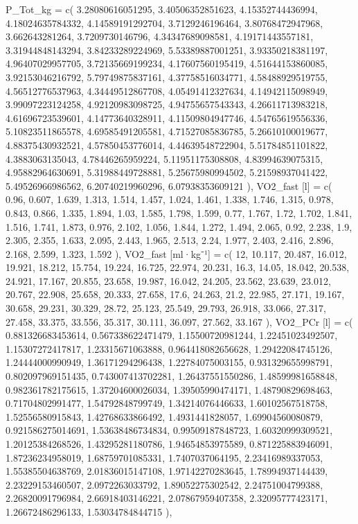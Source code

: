\documentclass[
  letterpaper,
  DIV=11]{scrartcl}
\newenvironment{Shaded}{\begin{snugshade}}{\end{snugshade}}
\newcommand{\NormalTok}[1]{\textcolor[rgb]{0.00,0.23,0.31}{#1}}
\begin{document}
\begin{Shaded}
\begin{Highlighting}[]
\NormalTok{  \textasciigrave{}P\_Tot\_kg\textasciigrave{} = c( 3.28080616051295, 3.40506352851623, 4.15352744436994, 4.18024635784332, 4.14589191292704, 3.7129246196464, 3.80768472947968, 3.662643281264, 3.7209730146796, 4.34347689098581, 4.19171443557181, 3.31944848143294, 3.84233289224969, 5.53389887001251, 3.93350218381197, 4.96407029957705, 3.72135669199234, 4.17607560195419, 4.51644153860085, 3.92153046216792, 5.79749875837161, 4.37758516034771, 4.58488929519755, 4.56512776537963, 4.34449512867708, 4.05491412327634, 4.14942115098949, 3.99097223124258, 4.92120983098725, 4.94755657543343, 4.26611713983218, 4.61696723539601, 4.14773640328911, 4.11509804947746, 4.54765619556336, 5.10823511865578, 4.69585491205581, 4.71527085836785, 5.26610100019677, 4.88375430932521, 4.57850453776014, 4.44639548722904, 5.51784851101822, 4.3883063135043, 4.78446265959224, 5.11951175308808, 4.83994639075315, 4.95882964630691, 5.31988449728881, 5.25675980994502, 5.21598937041422, 5.49526966986562, 6.20740219960296, 6.07938353609121 ),}
\NormalTok{  \textasciigrave{}VO2\_fast [l]\textasciigrave{} = c( 0.96, 0.607, 1.639, 1.313, 1.514, 1.457, 1.024, 1.461, 1.338, 1.746, 1.315, 0.978, 0.843, 0.866, 1.335, 1.894, 1.03, 1.585, 1.798, 1.599, 0.77, 1.767, 1.72, 1.702, 1.841, 1.516, 1.741, 1.873, 0.976, 2.102, 1.056, 1.844, 1.272, 1.494, 2.065, 0.92, 2.238, 1.9, 2.305, 2.355, 1.633, 2.095, 2.443, 1.965, 2.513, 2.24, 1.977, 2.403, 2.416, 2.896, 2.168, 2.599, 1.323, 1.592 ),}
\NormalTok{  \textasciigrave{}VO2\_fast [ml·kg⁻¹]\textasciigrave{} = c( 12, 10.117, 20.487, 16.012, 19.921, 18.212, 15.754, 19.224, 16.725, 22.974, 20.231, 16.3, 14.05, 18.042, 20.538, 24.921, 17.167, 20.855, 23.658, 19.987, 16.042, 24.205, 23.562, 23.639, 23.012, 20.767, 22.908, 25.658, 20.333, 27.658, 17.6, 24.263, 21.2, 22.985, 27.171, 19.167, 30.658, 29.231, 30.329, 28.72, 25.123, 25.549, 29.793, 26.918, 33.066, 27.317, 27.458, 33.375, 33.556, 35.317, 30.111, 36.097, 27.562, 33.167 ),}
\NormalTok{  \textasciigrave{}VO2\_PCr [l]\textasciigrave{} = c( 0.881326683453614, 0.567338622471479, 1.15500720981244, 1.22451023492507, 1.15307272417817, 1.23315671063888, 0.964418082656628, 1.29422084745126, 1.24444000990949, 1.36171294296438, 1.22784075003155, 0.931329655998791, 0.802097969151435, 0.743007413702281, 1.26437551550286, 1.48599981658848, 0.982361782175615, 1.37204600026034, 1.39505990474171, 1.48790829698463, 0.71704802991477, 1.54792848799749, 1.34214076446633, 1.60102567518758, 1.52556580915843, 1.42768633866492, 1.4931441828057, 1.69904560080879, 0.921586275014691, 1.53638486734834, 0.99509187848723, 1.60320999309521, 1.20125384268526, 1.43295281180786, 1.94654853975589, 0.871225883946091, 1.87236234958019, 1.68759701085331, 1.7407037064195, 2.23416989337053, 1.55385504638769, 2.01836015147108, 1.97142270283645, 1.78994937144439, 2.23229153460507, 2.0972263033792, 1.89052275302542, 2.24751004799388, 2.26820091796984, 2.66918403146221, 2.07867959407358, 2.32095777423171, 1.26672486296133, 1.53034784844715 ),}

\end{Highlighting}
\end{Shaded}
\end{document}
